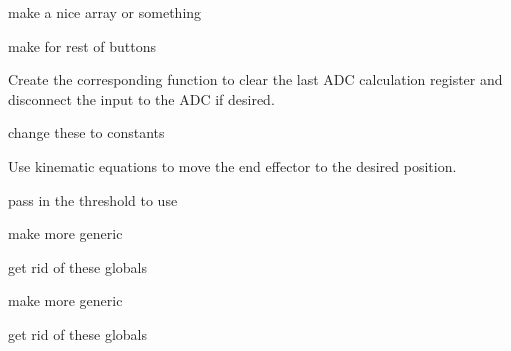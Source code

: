 
\begin{DoxyRefList}
\item[\label{todo__todo000006}%
\hypertarget{todo__todo000006}{}%
Member \hyperlink{button_8c_ab1786ed48313233e3df624178bd9b707}{b7} ]make a nice array or something 

make for rest of buttons  
\item[\label{todo__todo000001}%
\hypertarget{todo__todo000001}{}%
Member \hyperlink{_a_d_c_8c_a3eef680fc13f11498db80fb145cab8f9}{clear\+A\+DC} (int channel)]Create the corresponding function to clear the last A\+DC calculation register and disconnect the input to the A\+DC if desired.  
\item[\label{todo__todo000002}%
\hypertarget{todo__todo000002}{}%
Member \hyperlink{arm_8c_ab1df5f43b22723b086d287834af86099}{degrees\+Per\+Joint2\+Val} ]change these to constants  
\item[\label{todo__todo000009}%
\hypertarget{todo__todo000009}{}%
Member \hyperlink{motors_8c_aa294b49bfcc17cf4b490fb020e359851}{goto\+XY} (int x, int y)]Use kinematic equations to move the end effector to the desired position.  
\item[\label{todo__todo000005}%
\hypertarget{todo__todo000005}{}%
Member \hyperlink{arm_8c_a39c5ec2326206bfdd7d3c68693cf8143}{in\+Position} (int theta1, int theta2)]pass in the threshold to use  
\item[\label{todo__todo000008}%
\hypertarget{todo__todo000008}{}%
Member \hyperlink{lab1_8c_a2dcb6711e68dfcff6d48d6a4871589fa}{set\+Frequency\+For\+Post\+Scale} (int Frequency)]make more generic 
\item[\label{todo__todo000004}%
\hypertarget{todo__todo000004}{}%
Member \hyperlink{arm_8c_a6768686fa1db632b8d252e73b43633d5}{upper\+Angle} ]get rid of these globals  
\item[\label{todo__todo000007}%
\hypertarget{todo__todo000007}{}%
Member \hyperlink{lab1_8c_a374e2c796c7a4ffb45af9cde77c8cc14}{wait\+For\+Button7} ()]make more generic  
\item[\label{todo__todo000003}%
\hypertarget{todo__todo000003}{}%
Member \hyperlink{arm_8c_adec4b270699e4ef43679cf77763c719a}{y\+\_\+coord} ]get rid of these globals 
\end{DoxyRefList}